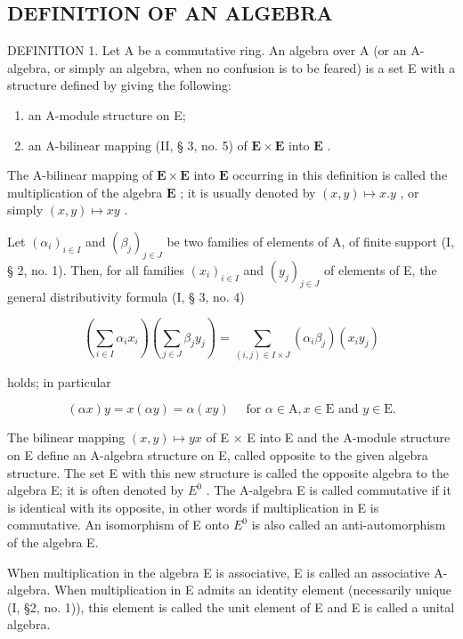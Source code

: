 \subsection{DEFINITION OF AN ALGEBRA}

DEFINITION 1. Let A be a commutative ring. An algebra over A (or an A-algebra, or simply an algebra, when no confusion is to be feared) is a set E with a structure defined by giving the following:

\begin{enumerate}
\def\labelenumi{(\arabic{enumi})}
\item
  an A-module structure on E;
\item
  an A-bilinear mapping (II, § 3, no. 5) of \(\mathbf{E} \times \mathbf{E}\) into \(\mathbf{E}\) .
\end{enumerate}

The A-bilinear mapping of \(\mathbf{E} \times \mathbf{E}\) into \(\mathbf{E}\) occurring in this definition is called the multiplication of the algebra \(\mathbf{E}\) ; it is usually denoted by \((x, y) \mapsto x.y\) , or simply \((x, y) \mapsto xy\) .

Let \((\alpha_{i})_{i\in I}\) and \((\beta_{j})_{j\in J}\) be two families of elements of A, of finite support (I, § 2, no. 1). Then, for all families \((x_{i})_{i\in I}\) and \((y_{j})_{j\in J}\) of elements of E, the general distributivity formula (I, § 3, no. 4)

\[
\left(\sum_ {i \in I} \alpha_ {i} x _ {i}\right) \left(\sum_ {j \in J} \beta_ {j} y _ {j}\right) = \sum_ {(i, j) \in I \times J} \left(\alpha_ {i} \beta_ {j}\right) \left(x _ {i} y _ {j}\right)\tag{1}
\]

holds; in particular

\[
(\alpha x) y = x (\alpha y) = \alpha (x y) \quad \text { for } \alpha \in \mathrm{A}, x \in \mathrm{E} \text { and } y \in \mathrm{E}.\tag{2}
\]

The bilinear mapping \((x,y)\mapsto yx\) of E × E into E and the A-module structure on E define an A-algebra structure on E, called opposite to the given algebra structure. The set E with this new structure is called the opposite algebra to the algebra E; it is often denoted by \(E^{0}\) . The A-algebra E is called commutative if it is identical with its opposite, in other words if multiplication in E is commutative. An isomorphism of E onto \(E^{0}\) is also called an anti-automorphism of the algebra E.

When multiplication in the algebra E is associative, E is called an associative A-algebra. When multiplication in E admits an identity element (necessarily unique (I, §2, no. 1)), this element is called the unit element of E and E is called a unital algebra.

